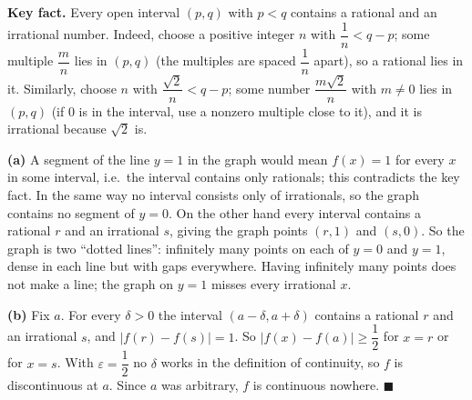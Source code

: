 \textbf{Key fact.} Every open interval $(p,q)$ with $p<q$ contains a rational and an irrational number. Indeed, choose a positive integer $n$ with $\dfrac{1}{n}<q-p$; some multiple $\dfrac {m}{n}$ lies in $(p,q)$ (the multiples are spaced $\dfrac{1}{n}$ apart), so a rational lies in it. Similarly, choose $n$ with $\dfrac{\sqrt2}{n}<q-p$; some number $\dfrac{m\sqrt2}{n}$ with $m\ne0$ lies in $(p,q)$ (if $0$ is in the interval, use a nonzero multiple close to it), and it is irrational because $\sqrt2$ is.

\textbf{(a)} A segment of the line $y=1$ in the graph would mean $f(x)=1$ for every $x$ in some interval, i.e.\ the interval contains only rationals; this contradicts the key fact. In the same way no interval consists only of irrationals, so the graph contains no segment of $y=0$. On the other hand every interval contains a rational $r$ and an irrational $s$, giving the graph points $(r,1)$ and $(s,0)$. So the graph is two ``dotted lines'': infinitely many points on each of $y=0$ and $y=1$, dense in each line but with gaps everywhere. Having infinitely many points does not make a line; the graph on $y=1$ misses every irrational $x$.

\textbf{(b)} Fix $a$. For every $\delta>0$ the interval $(a-\delta,a+\delta)$ contains a rational $r$ and an irrational $s$, and $|f(r)-f(s)|=1$. So $|f(x)-f(a)|\ge\dfrac{1}{2}$ for $x=r$ or for $x=s$. With $\varepsilon=\dfrac{1}{2}$ no $\delta$ works in the definition of continuity, so $f$ is discontinuous at $a$. Since $a$ was arbitrary, $f$ is continuous nowhere. $\blacksquare$
